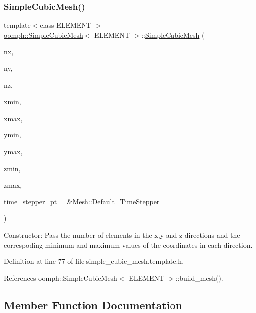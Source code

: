 \subsubsection{\texorpdfstring{Simple\+Cubic\+Mesh()}{SimpleCubicMesh()}\hspace{0.1cm}{\footnotesize\ttfamily [2/2]}}
{\footnotesize\ttfamily template$<$class E\+L\+E\+M\+E\+NT $>$ \\
\hyperlink{classoomph_1_1SimpleCubicMesh}{oomph\+::\+Simple\+Cubic\+Mesh}$<$ E\+L\+E\+M\+E\+NT $>$\+::\hyperlink{classoomph_1_1SimpleCubicMesh}{Simple\+Cubic\+Mesh} (\begin{DoxyParamCaption}\item[{const unsigned \&}]{nx,  }\item[{const unsigned \&}]{ny,  }\item[{const unsigned \&}]{nz,  }\item[{const double \&}]{xmin,  }\item[{const double \&}]{xmax,  }\item[{const double \&}]{ymin,  }\item[{const double \&}]{ymax,  }\item[{const double \&}]{zmin,  }\item[{const double \&}]{zmax,  }\item[{Time\+Stepper $\ast$}]{time\+\_\+stepper\+\_\+pt = {\ttfamily \&Mesh\+:\+:Default\+\_\+TimeStepper} }\end{DoxyParamCaption})\hspace{0.3cm}{\ttfamily [inline]}}



Constructor\+: Pass the number of elements in the x,y and z directions and the correspoding minimum and maximum values of the coordinates in each direction. 



Definition at line 77 of file simple\+\_\+cubic\+\_\+mesh.\+template.\+h.



References oomph\+::\+Simple\+Cubic\+Mesh$<$ E\+L\+E\+M\+E\+N\+T $>$\+::build\+\_\+mesh().



\subsection{Member Function Documentation}
\mbox{\label{classoomph_1_1SimpleCubicMesh_aea141bf600aaed7c7c9ccfa3f4f1edfc}} 
